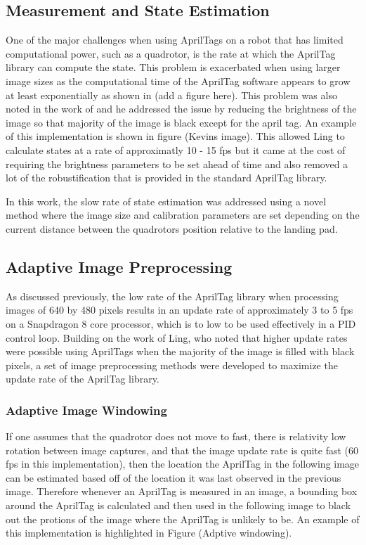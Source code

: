 \documentclass[11pt, twocolumn]{article}
\begin{document}
\subsection{Measurement and State Estimation}

One of the major challenges when using AprilTags on a robot that has limited computational power, such as a quadrotor, is the rate at which the AprilTag library can compute the state. This problem is exacerbated when using larger image sizes as the computational time of the AprilTag software appears to grow at least exponentially as shown in (add a figure here). This problem was also noted in the work of \cite{Ling2014} and he addressed the issue by reducing the brightness of the image so that majority of the image is black except for the april tag. An example of this implementation is shown in figure (Kevins image). This allowed Ling \cite{Lee2012} to calculate states at a rate of approximatly 10 - 15 fps but it came at the cost of requiring the brightness parameters to be set ahead of time and also removed a lot of the robustification that is provided in the standard AprilTag library.

In this work, the slow rate of state estimation was addressed using a novel method where the image size and calibration parameters are set depending on the current distance between the quadrotors position relative to the landing pad. 

\subsection{Adaptive Image Preprocessing}

As discussed previously, the low rate of the AprilTag library when processing images of 640 by 480 pixels results in an update rate of approximately 3 to 5 fps on a Snapdragon 8 core processor, which is to low to be used effectively in a PID control loop. Building on the work of Ling, who noted that higher update rates were possible using AprilTags when the majority of the image is filled with black pixels, a set of image preprocessing methods were developed to maximize the update rate of the AprilTag library. 

\subsubsection{Adaptive Image Windowing}

If one assumes that the quadrotor does not move to fast, there is relativity low rotation between image captures, and that the image update rate is quite fast (60 fps in this implementation), then the location the AprilTag in the following image can be estimated based off of the location it was last observed in the previous image. Therefore whenever an AprilTag is measured in an image, a bounding box around the AprilTag is calculated and then used in the following image to black out the protions of the image where the AprilTag is unlikely to be. An example of this implementation is highlighted in Figure (Adptive windowing).
\end{document}
